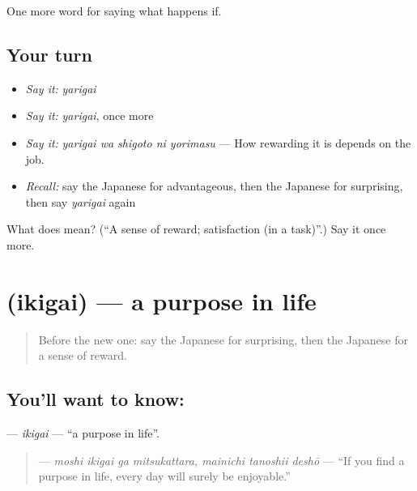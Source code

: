 \begin{grammarlens}[title={What you've built}]
One more word for saying what happens if.
\end{grammarlens}

\subsection*{Your turn}
\begin{itemize}
\raggedright
  \item \emph{Say it:} \emph{yarigai}
  \item \emph{Say it:} \emph{yarigai}, once more
  \item \emph{Say it:} \emph{yarigai wa shigoto ni yorimasu} — How rewarding it is depends on the job.
  \item \emph{Recall:} say the Japanese for advantageous, then the Japanese for surprising, then say \emph{yarigai} again
\end{itemize}

\begin{tcolorbox}[breakable,colback=teal!4,colframe=teal!35!black,title={Before you move on}]
What does  mean? (\textquotedblleft{}A sense of reward; satisfaction (in a task)\textquotedblright{}.) Say it once more.
\end{tcolorbox}
\section[\texorpdfstring{\ja{いきがい} (ikigai)}{いきがい (ikigai)}]{ (ikigai) — a purpose in life}

\label{lesson:JA-C533-ikigai}



\begin{quote}
Before the new one: say the Japanese for surprising, then the Japanese for a sense of reward.
\end{quote}

\subsection*{You'll want to know: }
\textbf{} — \emph{ikigai} — \textquotedblleft{}a purpose in life\textquotedblright{}.

\begin{quote}
\textbf{   } — \emph{moshi ikigai ga mitsukattara, mainichi tanoshii deshō} — \textquotedblleft{}If you find a purpose in life, every day will surely be enjoyable.\textquotedblright{}
\end{quote}

